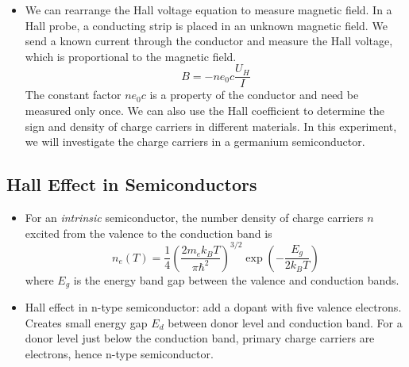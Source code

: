\documentclass[11pt, a4paper]{article}
\begin{document}
\begin{itemize}
	\item We can rearrange the Hall voltage equation to measure magnetic field. In a Hall probe, a conducting strip is placed in an unknown magnetic field. We send a known current through the conductor and measure the Hall voltage, which is proportional to the magnetic field.
	\begin{equation*}
		B = - ne_{0}c \frac{U_{H}}{I}
	\end{equation*}
	The constant factor $ ne_{0}c $ is a property of the conductor and need be measured only once. We can also use the Hall coefficient to determine the sign and density of charge carriers in different materials. In this experiment, we will investigate the charge carriers in a germanium semiconductor.
\end{itemize}



\subsection{Hall Effect in Semiconductors}

\begin{itemize}
	\item For an \textit{intrinsic} semiconductor, the number density of charge carriers $ n $ excited from the valence to the conduction band is
	\begin{equation*}
		n_{e}(T) = \frac{1}{4}\left(\frac{2m_{e}k_{B}T}{\pi \hbar^{2}}\right)^{3/2}\exp(-\frac{E_{g}}{2k_{B}T})
	\end{equation*}
	where $ E_{g} $ is the energy band gap between the valence and conduction bands.
	
	\item Hall effect in n-type semiconductor: add a dopant with five valence electrons. Creates small energy gap $ E_{d} $ between donor level and conduction band. For a donor level just below the conduction band, primary charge carriers are electrons, hence n-type semiconductor.
\end{itemize}
\end{document}
